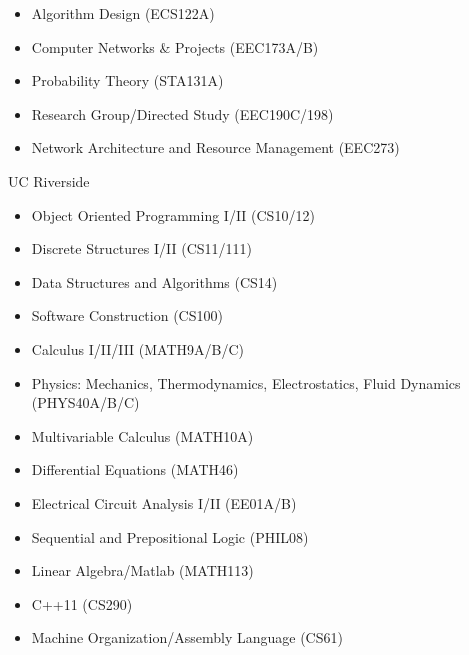\begin{cvcourses}
{\begin{multicols}{3}
\begin{itemize}
          \item Algorithm Design (ECS122A)
          \item Computer Networks \& Projects (EEC173A/B)
          \item Probability Theory (STA131A)
          \item Research Group/Directed Study (EEC190C/198)
          \item Network Architecture and Resource Management (EEC273)
        \end{itemize}
      \end{multicols}
    }
  \cvcourselist
    {UC Riverside} %
    {
      \begin{multicols}{3}
        \begin{itemize}
          \item Object Oriented Programming I/II (CS10/12)
          \item Discrete Structures I/II (CS11/111)
          \item Data Structures and Algorithms (CS14)
          \item Software Construction (CS100)
          \item Calculus I/II/III (MATH9A/B/C)
          \item Physics: Mechanics, Thermodynamics, Electrostatics, Fluid Dynamics (PHYS40A/B/C)
          \item Multivariable Calculus (MATH10A)
          \item Differential Equations (MATH46)
          \item Electrical Circuit Analysis I/II (EE01A/B)
          \item Sequential and Prepositional Logic (PHIL08)
          \item Linear Algebra/Matlab (MATH113)
          \item C++11 (CS290)
          \item Machine Organization/Assembly Language (CS61)
        \end{itemize}
      \end{multicols}
    }
\end{cvcourses}